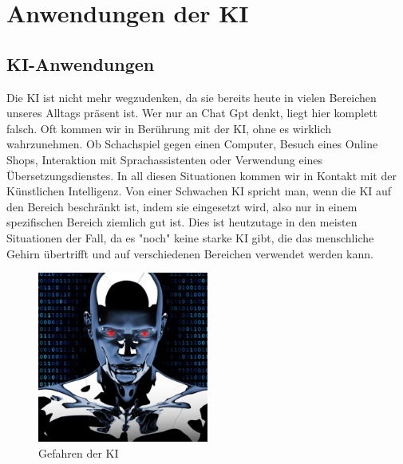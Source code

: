 \chapter{Anwendungen der KI}
\label{chap:Anwendungen}

\section{KI-Anwendungen}
Die KI ist nicht mehr wegzudenken, da sie bereits heute in vielen Bereichen unseres Alltags präsent ist. Wer nur an Chat Gpt denkt, liegt hier komplett falsch. Oft kommen wir in Berührung mit der KI, ohne es wirklich wahrzunehmen. Ob Schachspiel gegen einen Computer, Besuch eines Online Shops, Interaktion mit Sprachassistenten oder Verwendung eines Übersetzungsdienstes. In all diesen Situationen kommen wir in Kontakt mit der Künstlichen Intelligenz. Von einer Schwachen KI spricht man, wenn die KI auf den Bereich beschränkt ist, indem sie eingesetzt wird, also nur in einem spezifischen Bereich ziemlich gut ist. Dies ist heutzutage in den meisten Situationen der Fall, da es "noch" keine starke KI gibt, die das menschliche Gehirn übertrifft und auf verschiedenen Bereichen verwendet werden kann. 

\begin{figure}[h]
    \centering
    \includegraphics[width=0.5\textwidth]{AI1.jpg} 
    \caption{Gefahren der KI}
    \label{fig:ai}
\end{figure}

